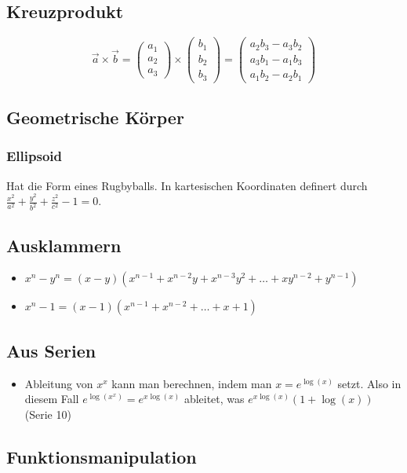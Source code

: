 \begin{multicols}{2}
\subsection{Kreuzprodukt}
{\footnotesize
\[
\vec{a} \times \vec{b} = \left ( \begin{array}{c} a_1 \\ a_2 \\ a_3 \end{array}
\right ) \times
\left ( \begin{array}{c} b_1 \\ b_2 \\ b_3 \end{array}
\right ) =
\left ( \begin{array}{c} a_2b_3 - a_3b_2 \\ a_3b_1 - a_1b_3 \\ a_1b_2 - a_2b_1
\end{array} \right )
\]
}

\subsection{Geometrische Körper}
\subsubsection{Ellipsoid}
Hat die Form eines Rugbyballs. In kartesischen Koordinaten definert durch
$\frac{x^2}{a^2} + \frac{y^2}{b^2} + \frac{z^2}{c^2} - 1 = 0$.

\subsection{Ausklammern}
\begin{itemize}[leftmargin=*]
	\item $x^n - y^n = (x-y) (x^{n-1} + x^{n-2}y + x^{n-3}y^2 + \ldots + xy^{n-2}
	+ y^{n-1})$
	\item $x^n - 1 = (x-1)(x^{n-1} + x^{n-2} + \ldots + x + 1)$
\end{itemize}

\subsection{Aus Serien}
\begin{itemize}[leftmargin=*]
	\item Ableitung von $x^x$ kann man berechnen, indem man $x = e^{\log(x)}$
	setzt. Also in diesem Fall $e^{\log(x^x)} = e^{x \log(x)}$ ableitet, was $e^{x
	\log(x)} (1 + \log(x))$ (Serie 10)
\end{itemize}

\subsection{Funktionsmanipulation}

\end{multicols}
